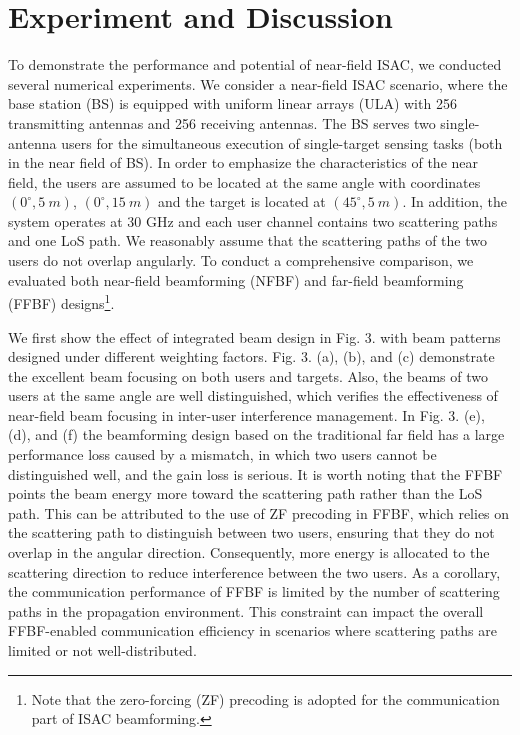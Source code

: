 \documentclass[10pt,journal,twocolumn,twoside]{IEEEtran} %
\begin{document}
\section{Experiment and Discussion}
To demonstrate the performance and potential of near-field ISAC, we conducted several numerical experiments. We consider a near-field ISAC scenario, where the base station (BS) is equipped with uniform linear arrays (ULA) with 256 transmitting antennas and 256 receiving antennas. The BS serves two single-antenna users for the simultaneous execution of single-target sensing tasks (both in the near field of BS). In order to emphasize the characteristics of the near field, the users are assumed to be located at the same angle with coordinates $(0^\circ, 5~m)$, $(0^\circ, 15~m)$ and the target is located at $(45^\circ, 5~m)$. In addition, the system operates at $30$ GHz and each user channel contains two scattering paths and one LoS path. We reasonably assume that the scattering paths of the two users do not overlap angularly.  
To conduct a comprehensive comparison, we evaluated both near-field beamforming (NFBF) and far-field beamforming (FFBF) designs\footnote{Note that the zero-forcing (ZF) precoding is adopted for the communication part of ISAC beamforming.}.

We first show the effect of integrated beam design in Fig. 3. with beam patterns designed under different weighting factors. Fig. 3. (a), (b), and (c) demonstrate the excellent beam focusing on both users and targets. Also, the beams of two users at the same angle are well distinguished, which verifies the effectiveness of near-field beam focusing in inter-user interference management. 
In Fig. 3. (e), (d), and (f) the beamforming design based on the traditional far field has a large performance loss caused by a mismatch, in which two users cannot be distinguished well, and the gain loss is serious. 
It is worth noting that the FFBF points the beam energy more toward the scattering path rather than the LoS path. This can be attributed to the use of ZF precoding in FFBF, which relies on the scattering path to distinguish between two users, ensuring that they do not overlap in the angular direction. Consequently, more energy is allocated to the scattering direction to reduce interference between the two users. As a corollary, the communication performance of FFBF is limited by the number of scattering paths in the propagation environment. This constraint can impact the overall FFBF-enabled communication efficiency in scenarios where scattering paths are limited or not well-distributed.
\end{document}
